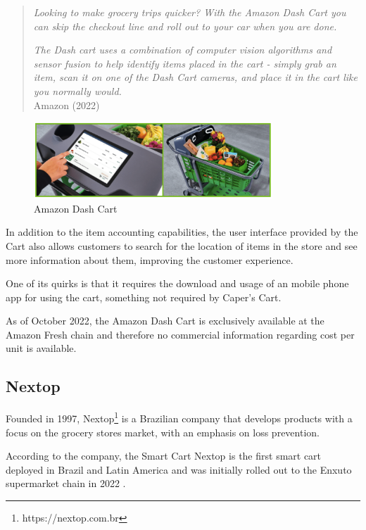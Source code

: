 \documentclass[openright]{normas-utf-tex} %
\begin{document}
\begin{quote}
\textit{Looking to make grocery trips quicker? With the Amazon Dash Cart you can skip the checkout line and roll out to your car when you are done.}

\textit{The Dash cart uses a combination of computer vision algorithms and sensor fusion to help identify items placed in the cart - simply grab an item, scan it on one of the Dash Cart cameras, and place it in the cart like you normally would.}
\\
Amazon (2022)
\end{quote}

\begin{figure}[H]
	\centering
	\includegraphics[width=0.8\textwidth]{./images/dashcart.png}
    \caption[Amazon Dash Cart]{Amazon Dash Cart}
    \label{fig:dashcart}
\end{figure}

In addition to the item accounting capabilities, the user interface provided by
the Cart also allows customers to search for the location of items  in the
store and see more information about them, improving the customer experience.

One of its quirks is that it requires the download and usage of an mobile phone
app for using the cart, something not required by Caper's Cart.

As of October 2022, the Amazon Dash Cart is exclusively available at the Amazon
Fresh chain and therefore no commercial information regarding cost per unit is
available.

\subsection{Nextop}

Founded in 1997, Nextop\footnote{https://nextop.com.br} is a Brazilian company
that develops products with a focus on the grocery stores market, with an emphasis on
loss prevention.

According to the company, the Smart Cart Nextop is the first smart cart
deployed in Brazil and Latin America and was initially rolled out to the Enxuto
supermarket chain in 2022 \cite{Paraiba2022}.
\end{document}
